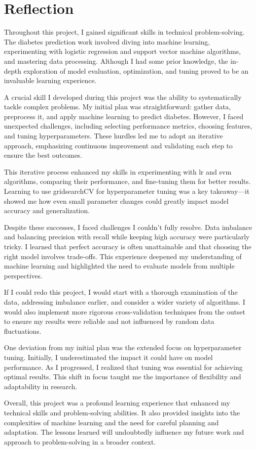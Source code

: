 \chapter{Reflection}
\label{ch:reflection}
Throughout this project, I gained significant skills in technical problem-solving. The diabetes prediction work involved diving into machine learning, experimenting with logistic regression and support vector machine algorithms, and mastering data processing. Although I had some prior knowledge, the in-depth exploration of model evaluation, optimization, and tuning proved to be an invaluable learning experience.

A crucial skill I developed during this project was the ability to systematically tackle complex problems. My initial plan was straightforward: gather data, preprocess it, and apply machine learning to predict diabetes. However, I faced unexpected challenges, including selecting performance metrics, choosing features, and tuning hyperparameters. These hurdles led me to adopt an iterative approach, emphasizing continuous improvement and validating each step to ensure the best outcomes.

This iterative process enhanced my skills in experimenting with lr and svm algorithms, comparing their performance, and fine-tuning them for better results. Learning to use gridsearchCV for hyperparameter tuning was a key takeaway—it showed me how even small parameter changes could greatly impact model accuracy and generalization.

Despite these successes, I faced challenges I couldn't fully resolve. Data imbalance and balancing precision with recall while keeping high accuracy were particularly tricky. I learned that perfect accuracy is often unattainable and that choosing the right model involves trade-offs. This experience deepened my understanding of machine learning and highlighted the need to evaluate models from multiple perspectives.

If I could redo this project, I would start with a thorough examination of the data, addressing imbalance earlier, and consider a wider variety of algorithms. I would also implement more rigorous cross-validation techniques from the outset to ensure my results were reliable and not influenced by random data fluctuations.

One deviation from my initial plan was the extended focus on hyperparameter tuning. Initially, I underestimated the impact it could have on model performance. As I progressed, I realized that tuning was essential for achieving optimal results. This shift in focus taught me the importance of flexibility and adaptability in research.

Overall, this project was a profound learning experience that enhanced my technical skills and problem-solving abilities. It also provided insights into the complexities of machine learning and the need for careful planning and adaptation. The lessons learned will undoubtedly influence my future work and approach to problem-solving in a broader context.


